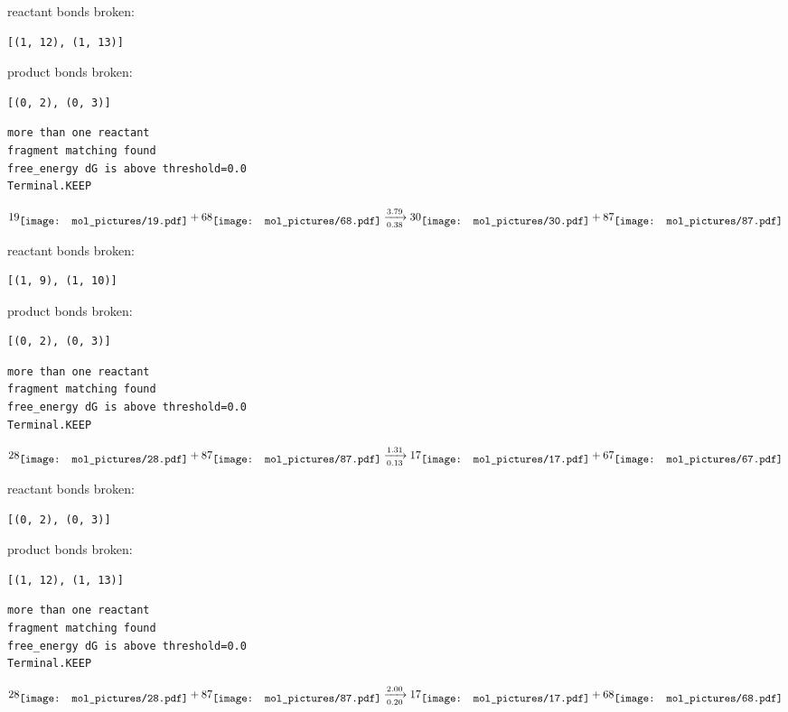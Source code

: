 \documentclass{article}
\begin{document}
reactant bonds broken:\begin{verbatim}
[(1, 12), (1, 13)]
\end{verbatim}
product bonds broken:\begin{verbatim}
[(0, 2), (0, 3)]
\end{verbatim}




\vspace{1cm}
\begin{verbatim}
more than one reactant
fragment matching found
free_energy dG is above threshold=0.0
Terminal.KEEP
\end{verbatim}
$$
19
\raisebox{-.5\height}{\texttt{[image: mol\_pictures/19.pdf]}}
+
68
\raisebox{-.5\height}{\texttt{[image: mol\_pictures/68.pdf]}}
\xrightarrow[0.38]{3.79}
30
\raisebox{-.5\height}{\texttt{[image: mol\_pictures/30.pdf]}}
+
87
\raisebox{-.5\height}{\texttt{[image: mol\_pictures/87.pdf]}}
$$


reactant bonds broken:\begin{verbatim}
[(1, 9), (1, 10)]
\end{verbatim}
product bonds broken:\begin{verbatim}
[(0, 2), (0, 3)]
\end{verbatim}




\vspace{1cm}
\begin{verbatim}
more than one reactant
fragment matching found
free_energy dG is above threshold=0.0
Terminal.KEEP
\end{verbatim}
$$
28
\raisebox{-.5\height}{\texttt{[image: mol\_pictures/28.pdf]}}
+
87
\raisebox{-.5\height}{\texttt{[image: mol\_pictures/87.pdf]}}
\xrightarrow[0.13]{1.31}
17
\raisebox{-.5\height}{\texttt{[image: mol\_pictures/17.pdf]}}
+
67
\raisebox{-.5\height}{\texttt{[image: mol\_pictures/67.pdf]}}
$$


reactant bonds broken:\begin{verbatim}
[(0, 2), (0, 3)]
\end{verbatim}
product bonds broken:\begin{verbatim}
[(1, 12), (1, 13)]
\end{verbatim}




\vspace{1cm}
\begin{verbatim}
more than one reactant
fragment matching found
free_energy dG is above threshold=0.0
Terminal.KEEP
\end{verbatim}
$$
28
\raisebox{-.5\height}{\texttt{[image: mol\_pictures/28.pdf]}}
+
87
\raisebox{-.5\height}{\texttt{[image: mol\_pictures/87.pdf]}}
\xrightarrow[0.20]{2.00}
17
\raisebox{-.5\height}{\texttt{[image: mol\_pictures/17.pdf]}}
+
68
\raisebox{-.5\height}{\texttt{[image: mol\_pictures/68.pdf]}}
$$
\end{document}
